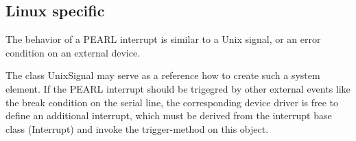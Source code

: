 \subsection{Linux specific}
The behavior of a PEARL interrupt is similar to a Unix signal,
or an error condition on an external device.

The class UnixSignal may serve as a reference how to create such a
system element.
If the PEARL interrupt should be trigegred by other  external events like
the break condition on the serial line, the corresponding device driver is
free to define an additional interrupt, which must be derived from the
interrupt base class (Interrupt)  and invoke the trigger-method on this 
object.

